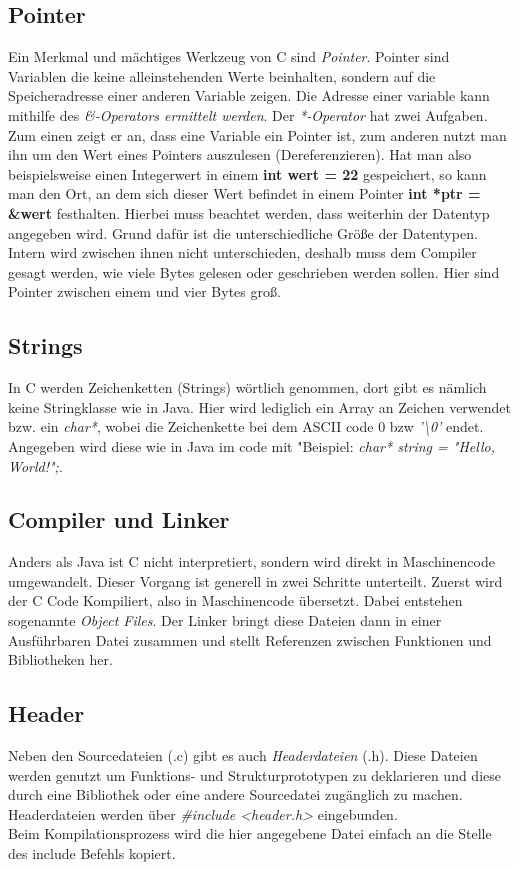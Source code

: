 \documentclass{article}
\begin{document}
\subsection{Pointer}
Ein Merkmal und mächtiges Werkzeug von C sind \textit{Pointer}. Pointer sind Variablen die keine alleinstehenden Werte beinhalten, sondern auf die Speicheradresse einer anderen Variable zeigen.
Die Adresse einer variable kann mithilfe des \textit{\&-Operators ermittelt werden}. Der \textit{*-Operator} hat zwei Aufgaben. Zum einen zeigt er an, dass eine Variable ein Pointer ist, zum anderen nutzt man ihn um den Wert eines Pointers auszulesen (Dereferenzieren).
Hat man also beispielsweise einen Integerwert in einem \textbf{int wert = 22} gespeichert, so kann man den Ort, an dem sich dieser Wert befindet in einem Pointer \textbf{int *ptr = \&wert} festhalten. Hierbei muss beachtet werden, dass weiterhin der Datentyp angegeben wird.
Grund dafür ist die unterschiedliche Größe der Datentypen. Intern wird zwischen ihnen nicht unterschieden, deshalb muss dem Compiler gesagt werden, wie viele Bytes gelesen oder geschrieben werden sollen. Hier sind Pointer zwischen einem und vier Bytes groß.

\subsection{Strings}
In C werden Zeichenketten (Strings) wörtlich genommen, dort gibt es nämlich keine Stringklasse wie in Java. Hier wird lediglich ein Array an Zeichen verwendet bzw. ein \textit{char*}, wobei die Zeichenkette bei dem ASCII code 0 bzw \textit{'\textbackslash 0'} endet.
Angegeben wird diese wie in Java im code mit "\newline Beispiel: \textit{char* string = "Hello, World!";}.

\subsection{Compiler und Linker}
Anders als Java ist C nicht interpretiert, sondern wird direkt in Maschinencode umgewandelt. Dieser Vorgang ist generell in zwei Schritte unterteilt. Zuerst wird der C Code Kompiliert, also in Maschinencode übersetzt. Dabei entstehen sogenannte \textit{Object Files}. Der Linker bringt diese Dateien dann in
einer Ausführbaren Datei zusammen und stellt Referenzen zwischen Funktionen und Bibliotheken her.
\subsection{Header}
Neben den Sourcedateien (.c) gibt es auch \textit{Headerdateien} (.h). Diese Dateien werden genutzt um Funktions- und Strukturprototypen zu deklarieren und diese durch eine Bibliothek oder eine andere Sourcedatei zugänglich zu machen.
Headerdateien werden über \textit{\#include {\textless}header.h{\textgreater}} eingebunden. \\Beim Kompilationsprozess wird die hier angegebene Datei einfach an die Stelle des include Befehls kopiert.
\end{document}

